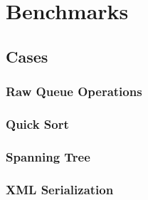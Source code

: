\section{Benchmarks}
\label{sec:benchmarks}

\subsection{Cases}
\subsubsection{Raw Queue Operations} %
\subsubsection{Quick Sort} %
\subsubsection{Spanning Tree} %
\subsubsection{XML Serialization} %
